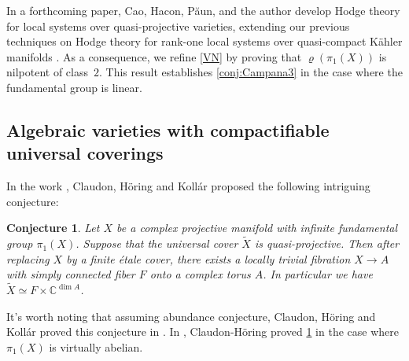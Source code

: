 \documentclass[english]{amsproc}
\theoremstyle{plain}
\newtheorem{conjecture}[thm]{Conjecture}
\theoremstyle{definition}
\theoremstyle{remark}
\theoremstyle{plain}
\numberwithin{equation}{thm} %
\newcommand{\GL}{{\rm GL}}
\begin{document}
	
	In a forthcoming paper, Cao, Hacon, Păun, and the  author \cite{CDP25} develop Hodge theory for local systems over quasi-projective varieties, extending our previous techniques on Hodge theory for rank-one local systems over quasi-compact Kähler manifolds \cite{CDHP25}. As a consequence, we  refine \cref{VN} by proving that $\varrho(\pi_1(X))$ is nilpotent of class~$2$. This result establishes \cref{conj:Campana3} in the case where the fundamental group is linear.
		\subsection{Algebraic varieties with compactifiable universal coverings}
		In the work \cite{CHK13,CH13}, Claudon, H\"oring and Koll\'ar proposed the following intriguing conjecture:
		\begin{conjecture}\label{conj}
			Let $X$ be a complex projective manifold with infinite fundamental group $\pi_1(X)$. Suppose that the universal cover $\widetilde{X}$ is quasi-projective. Then   after replacing $X$ by a  finite étale cover,   there exists a locally trivial fibration $X \rightarrow A$ with simply connected fiber  $F$ onto a complex torus $A$. In particular we have $\widetilde{X}\simeq F \times \mathbb{C}^{\operatorname{dim} A}$.
		\end{conjecture}
		It's worth noting that assuming abundance conjecture, Claudon, H\"oring and Koll\'ar proved this conjecture in \cite{CHK13}. In \cite{CH13}, Claudon-H\"oring proved \cref{conj} in the case where $\pi_1(X)$ is virtually abelian. 
		
\end{document}
